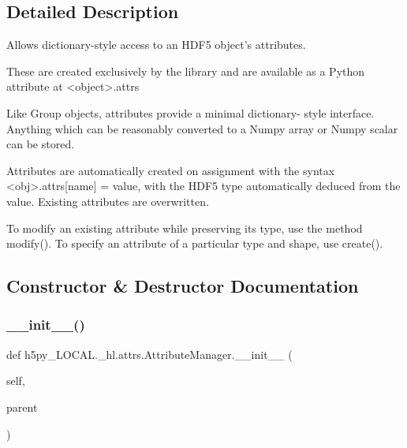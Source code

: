 \subsection{Detailed Description}
\begin{DoxyVerb}    Allows dictionary-style access to an HDF5 object's attributes.

    These are created exclusively by the library and are available as
    a Python attribute at <object>.attrs

    Like Group objects, attributes provide a minimal dictionary-
    style interface.  Anything which can be reasonably converted to a
    Numpy array or Numpy scalar can be stored.

    Attributes are automatically created on assignment with the
    syntax <obj>.attrs[name] = value, with the HDF5 type automatically
    deduced from the value.  Existing attributes are overwritten.

    To modify an existing attribute while preserving its type, use the
    method modify().  To specify an attribute of a particular type and
    shape, use create().
\end{DoxyVerb}
 

\subsection{Constructor \& Destructor Documentation}
\mbox{\label{classh5py__LOCAL_1_1__hl_1_1attrs_1_1AttributeManager_ad4ae8a329ba0186e379690b54fb6d000}} 
\subsubsection{\texorpdfstring{\+\_\+\+\_\+init\+\_\+\+\_\+()}{\_\_init\_\_()}}
{\footnotesize\ttfamily def h5py\+\_\+\+L\+O\+C\+A\+L.\+\_\+hl.\+attrs.\+Attribute\+Manager.\+\_\+\+\_\+init\+\_\+\+\_\+ (\begin{DoxyParamCaption}\item[{}]{self,  }\item[{}]{parent }\end{DoxyParamCaption})}

